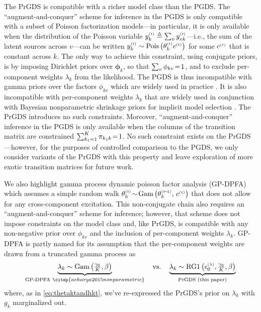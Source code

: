 \documentclass{article}
\begin{document}
The PrGDS is compatible with a richer model class than the PGDS. The ``augment-and-conquer'' scheme for inference in the PGDS is only compatible with a subset of Poisson factorization models---in particular, it is only available when the distribution of the Poisson variable $\ykt \triangleq \sum_v y^{\mathsmaller{(t)}}_{vk}$---i.e., the sum of the latent sources across $v$---can be written $\ykt \sim \Pois{\thetakt c^{\mathsmaller{(t)}}}$ for some $c^{\mathsmaller{(t)}}$ that is constant across $k$. The only way to achieve this constraint, using conjugate priors, is by imposing Dirichlet priors over $\boldsymbol{\phi}_k$, so that $\sum_v \phi_{kv}\!=\! 1$, and to exclude per-component weights $\lambda_k$ from the likelihood. The PGDS is thus incompatible with gamma priors over the factors $\phi_{kv}$ which are widely used in practice \cite{cemgil2009bayesian,gopalan2015scalable,schein2015bayesian}. It is also incompatible with per-component weights $\lambda_k$ that are widely used in conjunction with Bayesian nonparametric shrinkage priors for implicit model selection \cite{acharya2015nonparametric,schein2016bayesian}. The PrGDS introduces no such constraints. Moreover, ``augment-and-conquer'' inference in the PGDS is only available when the columns of the transition matrix are constrained $\sum_{k_1=1}^K \pi_{k_1k} \!=\! 1$. No such constraint exists on the PrGDS---however, for the purposes of controlled comparison to the PGDS, we only consider variants of the PrGDS with this property and leave exploration of more exotic transition matrices for future work.


We also highlight gamma process dynamic poisson factor analysis (GP-DPFA)~\citep{acharya2015nonparametric} which assumes a simple random walk $\thetakt \tsim \Gam{\theta^{\mathsmaller{(t \tm 1)}}_k,\, c^{\mathsmaller{(t)}}}$ that does not allow for any cross-component excitation. This non-conjugate chain also requires an ``augment-and-conquer'' scheme for inference; however, that scheme does not impose constraints on the model class and, like PrGDS, is compatible with any non-negative prior over $\phi_{kv}$ and the inclusion of per-component weights $\lambda_k$. GP-DPFA is partly named for its assumption that the per-component weights are drawn from a truncated gamma process as~
\begin{equation}
\label{eq:gpdpfa}
\underbrace{\lambda_k \sim \Gam{\tfrac{\gamma_0}{K},\beta}}_{\textrm{GP-DPFA}~\citep{acharya2015nonparametric}}
% 
\hspace{1em}\textrm{vs.}\hspace{1em} 
% 
\underbrace{\lambda_k \sim \textrm{RG1}\left(\epslambda, \tfrac{\gamma_0}{K},\beta\right)}_{\textrm{PrGDS (this paper)}}
\end{equation} 
where, as in \cref{eq:thetaktandhkt}, we've re-expressed the PrGDS's prior on $\lambda_k$ with $g_k$ marginalized out.
\end{document}
